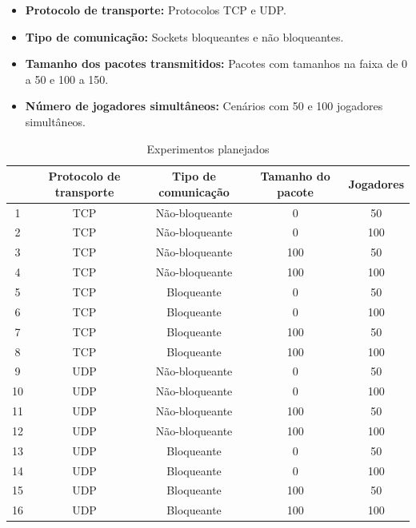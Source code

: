 \documentclass[12pt]{article}
\begin{document}
\begin{itemize}
  \item \textbf{Protocolo de transporte:} Protocolos TCP e UDP.
  \item \textbf{Tipo de comunicação:} Sockets bloqueantes e não bloqueantes.
  \item \textbf{Tamanho dos pacotes transmitidos:} Pacotes com tamanhos na faixa de 0 a 50 e 100 a 150.
  \item \textbf{Número de jogadores simultâneos:} Cenários com 50 e 100 jogadores simultâneos.
\end{itemize}

\begin{table}
  \center
  \footnotesize
  \begin{tabular}{|c|c|c|c|c|}
  \hline
      & \textbf{Protocolo de transporte} & \textbf{Tipo de comunicação} & \textbf{Tamanho do pacote} & \textbf{Jogadores} \\ \hline
    1 & TCP & Não-bloqueante & 0 & 50 \\ \hline
    2 & TCP & Não-bloqueante & 0 & 100 \\ \hline
    3 & TCP & Não-bloqueante & 100 & 50 \\ \hline
    4 & TCP & Não-bloqueante & 100 & 100 \\ \hline
    5 & TCP & Bloqueante & 0 & 50 \\ \hline
    6 & TCP & Bloqueante & 0 & 100 \\ \hline
    7 & TCP & Bloqueante & 100 & 50 \\ \hline
    8 & TCP & Bloqueante & 100 & 100 \\ \hline
    9 & UDP & Não-bloqueante & 0 & 50 \\ \hline
    10 & UDP & Não-bloqueante & 0 & 100 \\ \hline
    11 & UDP & Não-bloqueante & 100 & 50 \\ \hline
    12 & UDP & Não-bloqueante & 100 & 100 \\ \hline
    13 & UDP & Bloqueante & 0 & 50 \\ \hline
    14 & UDP & Bloqueante & 0 & 100 \\ \hline
    15 & UDP & Bloqueante & 100 & 50 \\ \hline
    16 & UDP & Bloqueante & 100 & 100 \\ \hline
  \end{tabular} 
\caption{Experimentos planejados}
\label{tab:experimentos}
\end{table} 
\end{document}
